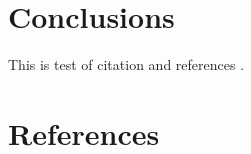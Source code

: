 \documentclass[a4paper, 12pt]{article}
\begin{document}
\section{Conclusions}
This is test of citation and references \cite{test}.

\section{References}
\begin{refsection}
\nocite{*}
\printbibliography[heading=none]
\end{refsection}
\end{document}
